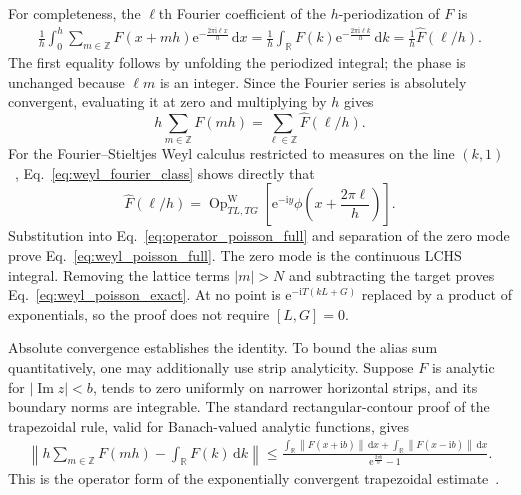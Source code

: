 \documentclass[aps,pra,reprint,floatfix,unsortedaddress,superscriptaddress]{revtex4-2}
\newcommand{\norm}[1]{\left\lVert#1\right\rVert}
\newcommand{\abs}[1]{\left\lvert#1\right\rvert}
\begin{document}
For completeness, the $\ell$th Fourier coefficient of the
$h$-periodization of $F$ is
\begin{align}
\frac{1}{h}\int_0^h
\sum_{m\in\mathbb Z}F(x+mh)
\mathrm e^{-\frac{2\pi\mathrm i\ell x}{h}}\,\mathrm dx
=
\frac{1}{h}\int_{\mathbb R}F(k)
\mathrm e^{-\frac{2\pi\mathrm i\ell k}{h}}\,\mathrm dk
=\frac{1}{h}\widehat F(\ell/h).
\label{eq:operator_periodization_coefficient}
\end{align}
The first equality follows by unfolding the periodized integral; the
phase is unchanged because $\ell m$ is an integer.  Since the Fourier
series is absolutely convergent, evaluating it at zero and multiplying
by $h$ gives
\begin{equation}
    h\sum_{m\in\mathbb Z}F(mh)
    =
    \sum_{\ell\in\mathbb Z}\widehat F(\ell/h).
    \label{eq:operator_poisson_full}
\end{equation}
For the Fourier--Stieltjes Weyl calculus restricted to measures on the
line $(k,1)$~\cite{weyl1950theory,anderson1969weyl,
jefferies2004spectral,ni2026quantumeigenvaluetransformationlinear},
Eq.~\eqref{eq:weyl_fourier_class} shows directly that
\begin{equation}
\widehat F(\ell/h)
=
\operatorname{Op}^{\mathrm W}_{TL,TG}
\!\left[
\mathrm e^{-\mathrm iy}
\phi\!\left(x+\frac{2\pi\ell}{h}\right)
\right].
\label{eq:weyl_mode_identification}
\end{equation}
Substitution into Eq.~\eqref{eq:operator_poisson_full} and separation of
the zero mode prove Eq.~\eqref{eq:weyl_poisson_full}.  The zero mode is
the continuous LCHS integral.  Removing the lattice terms
$\abs{m}>N$ and subtracting the target proves
Eq.~\eqref{eq:weyl_poisson_exact}.  At no point is
$\mathrm e^{-\mathrm iT(kL+G)}$ replaced by a product of exponentials,
so the proof does not require $[L,G]=0$.

Absolute convergence establishes the identity.  To bound the alias sum
quantitatively, one may additionally use strip analyticity.
Suppose $F$ is analytic for $\abs{\operatorname{Im}z}<b$, tends to zero
uniformly on narrower horizontal strips, and its boundary norms are
integrable.  The standard rectangular-contour proof of the
trapezoidal rule, valid for Banach-valued analytic functions, gives
\begin{align}
\left\|
h\sum_{m\in\mathbb Z}F(mh)-\int_{\mathbb R}F(k)\,\mathrm dk
\right\|\leq
\frac{
\displaystyle\int_{\mathbb R}\norm{F(x+\mathrm ib)}\,\mathrm dx+
\displaystyle\int_{\mathbb R}\norm{F(x-\mathrm ib)}\,\mathrm dx}
{\mathrm e^{\frac{2\pi b}{h}}-1}.
\label{eq:operator_trapezoidal_bound}
\end{align}
This is the operator form of the exponentially convergent
trapezoidal estimate~\cite{trefethen2014exponentially}.
\end{document}
